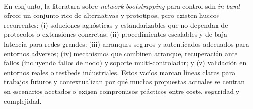 \\
En conjunto, la literatura sobre \textit{network bootstrapping} para control \gls{sdn} \textit{in-band} ofrece un conjunto rico de alternativas y prototipos, pero existen huecos recurrentes: (i) soluciones agnósticas y estandarizables que no dependan de protocolos o extensiones concretas; (ii) procedimientos escalables y de baja latencia para redes grandes; (iii) arranques seguros y autenticados adecuados para entornos adversos; (iv) mecanismos que combinen arranque, recuperación ante fallos (incluyendo fallos de nodo) y soporte multi-controlador; y (v) validación en entornos reales o testbeds industriales. Estos vacíos marcan líneas claras para trabajos futuros y contextualizan por qué muchas propuestas actuales se centran en escenarios acotados o exigen compromisos prácticos entre coste, seguridad y complejidad.\\
\\
